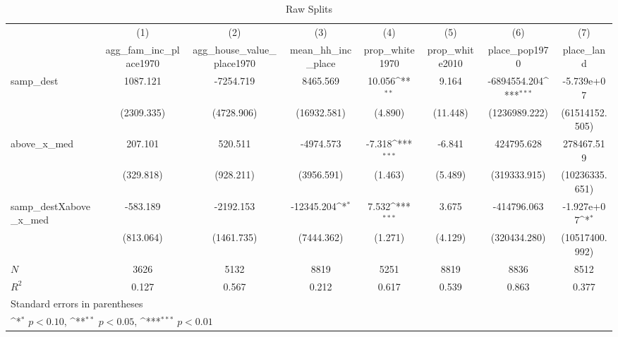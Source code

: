\begin{table}[htbp]\centering
\def\sym#1{\ifmmode^{#1}\else\(^{#1}\)\fi}
\caption{Raw Splits}
\begin{tabular}{l*{7}{c}}
\hline\hline
            &\multicolumn{1}{c}{(1)}&\multicolumn{1}{c}{(2)}&\multicolumn{1}{c}{(3)}&\multicolumn{1}{c}{(4)}&\multicolumn{1}{c}{(5)}&\multicolumn{1}{c}{(6)}&\multicolumn{1}{c}{(7)}\\
            &\multicolumn{1}{c}{agg\_fam\_inc\_place1970}&\multicolumn{1}{c}{agg\_house\_value\_place1970}&\multicolumn{1}{c}{mean\_hh\_inc\_place}&\multicolumn{1}{c}{prop\_white1970}&\multicolumn{1}{c}{prop\_white2010}&\multicolumn{1}{c}{place\_pop1970}&\multicolumn{1}{c}{place\_land}\\
\hline
samp\_dest   &    1087.121         &   -7254.719         &    8465.569         &      10.056\sym{**} &       9.164         &-6894554.204\sym{***}&  -5.739e+07         \\
            &  (2309.335)         &  (4728.906)         & (16932.581)         &     (4.890)         &    (11.448)         &(1236989.222)         &(61514152.505)         \\
[1em]
above\_x\_med &     207.101         &     520.511         &   -4974.573         &      -7.318\sym{***}&      -6.841         &  424795.628         &  278467.519         \\
            &   (329.818)         &   (928.211)         &  (3956.591)         &     (1.463)         &     (5.489)         &(319333.915)         &(10236335.651)         \\
[1em]
samp\_destXabove\_x\_med&    -583.189         &   -2192.153         &  -12345.204\sym{*}  &       7.532\sym{***}&       3.675         & -414796.063         &  -1.927e+07\sym{*}  \\
            &   (813.064)         &  (1461.735)         &  (7444.362)         &     (1.271)         &     (4.129)         &(320434.280)         &(10517400.992)         \\
\hline
\(N\)       &        3626         &        5132         &        8819         &        5251         &        8819         &        8836         &        8512         \\
\(R^{2}\)   &       0.127         &       0.567         &       0.212         &       0.617         &       0.539         &       0.863         &       0.377         \\
\hline\hline
\multicolumn{8}{l}{\footnotesize Standard errors in parentheses}\\
\multicolumn{8}{l}{\footnotesize \sym{*} \(p<0.10\), \sym{**} \(p<0.05\), \sym{***} \(p<0.01\)}\\
\end{tabular}
\end{table}
